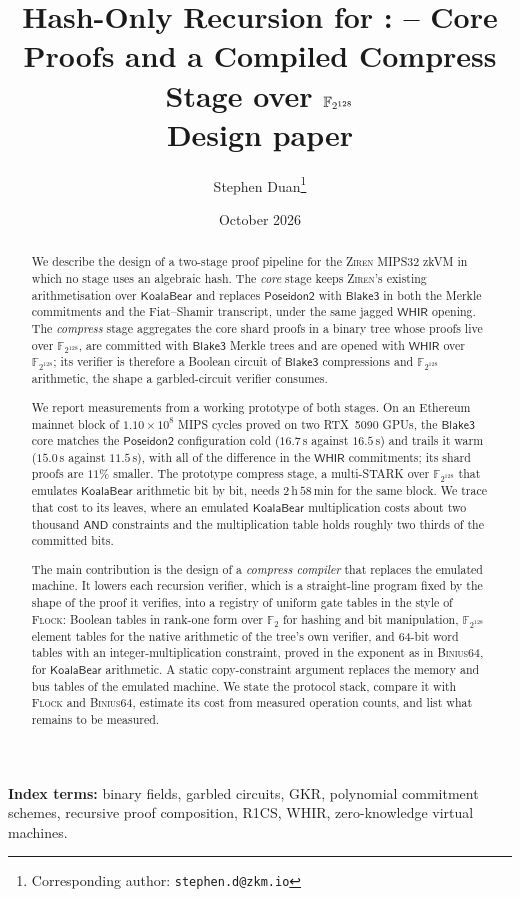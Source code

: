 \documentclass[10pt,letterpaper]{article}
\title{Hash-Only Recursion for \Ziren{}: \KB{}--\Blake{} Core Proofs and a Compiled Compress Stage over $\Ft$\\[0.4em]\large Design paper}
\author[1]{Stephen Duan\thanks{Corresponding author: \texttt{stephen.d@zkm.io}}}
\affil[1]{ZKM Team}
\date{October 2026}
\theoremstyle{definition}
\theoremstyle{remark}
\theoremstyle{plain}
\newcommand{\Ft}{\ensuremath{\mathbb{F}_{2^{128}}}}
\newcommand{\GFtwo}{\ensuremath{\mathbb{F}_{2}}}
\newcommand{\KB}{\ensuremath{\mathsf{KoalaBear}}}
\newcommand{\WHIR}{\ensuremath{\mathsf{WHIR}}}
\newcommand{\Blake}{\ensuremath{\mathsf{Blake3}}}
\newcommand{\Poseidon}{\ensuremath{\mathsf{Poseidon2}}}
\newcommand{\AND}{\ensuremath{\mathsf{AND}}}
\newcommand{\Ziren}{\textsc{Ziren}}
\newcommand{\Flock}{\textsc{Flock}}
\newcommand{\Binius}{\textsc{Binius64}}
\newcommand{\zkVM}{zkVM}
\begin{document}
\maketitle

\begin{abstract}
We describe the design of a two-stage proof pipeline for the \Ziren{} MIPS32 \zkVM{} in which no stage uses an algebraic hash. The \emph{core} stage keeps \Ziren{}'s existing arithmetisation over \KB{} and replaces \Poseidon{} with \Blake{} in both the Merkle commitments and the Fiat--Shamir transcript, under the same jagged \WHIR{} opening. The \emph{compress} stage aggregates the core shard proofs in a binary tree whose proofs live over $\Ft$, are committed with \Blake{} Merkle trees and are opened with \WHIR{} over $\Ft$; its verifier is therefore a Boolean circuit of \Blake{} compressions and $\Ft$ arithmetic, the shape a garbled-circuit verifier consumes.

We report measurements from a working prototype of both stages. On an Ethereum mainnet block of $1.10\times 10^8$ MIPS cycles proved on two RTX~5090 GPUs, the \Blake{} core matches the \Poseidon{} configuration cold ($16.7$\,s against $16.5$\,s) and trails it warm ($15.0$\,s against $11.5$\,s), with all of the difference in the \WHIR{} commitments; its shard proofs are $11\%$ smaller. The prototype compress stage, a multi-STARK over $\Ft$ that emulates \KB{} arithmetic bit by bit, needs $2$\,h\,$58$\,min for the same block. We trace that cost to its leaves, where an emulated \KB{} multiplication costs about two thousand \AND{} constraints and the multiplication table holds roughly two thirds of the committed bits.

The main contribution is the design of a \emph{compress compiler} that replaces the emulated machine. It lowers each recursion verifier, which is a straight-line program fixed by the shape of the proof it verifies, into a registry of uniform gate tables in the style of \Flock{}: Boolean tables in rank-one form over $\GFtwo$ for hashing and bit manipulation, $\Ft$ element tables for the native arithmetic of the tree's own verifier, and 64-bit word tables with an integer-multiplication constraint, proved in the exponent as in \Binius{}, for \KB{} arithmetic. A static copy-constraint argument replaces the memory and bus tables of the emulated machine. We state the protocol stack, compare it with \Flock{} and \Binius{}, estimate its cost from measured operation counts, and list what remains to be measured.
\end{abstract}

\noindent\textbf{Index terms:} binary fields, garbled circuits, GKR, polynomial commitment schemes, recursive proof composition, R1CS, WHIR, zero-knowledge virtual machines.













\FloatBarrier
\appendix


\clearpage


\end{document}
